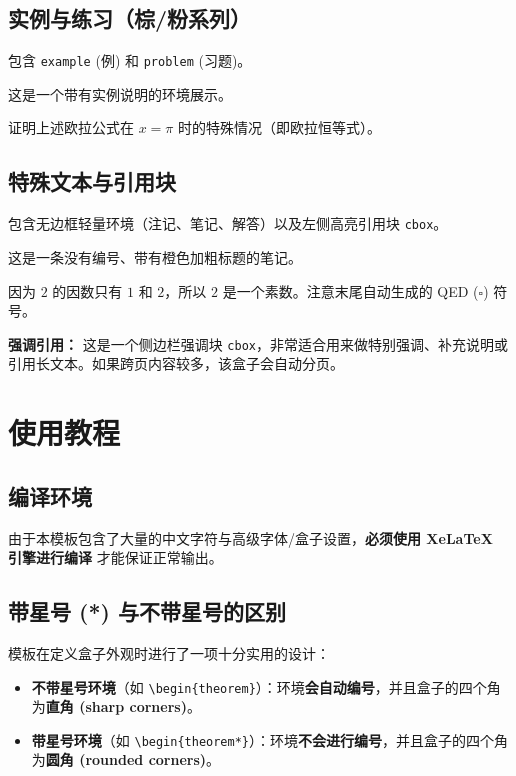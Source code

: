 \documentclass[UTF8]{ctexart}
\begin{document}
\subsection{实例与练习（棕/粉系列）}
包含 \verb|example| (例) 和 \verb|problem| (习题)。

\begin{example}[具体案例]
这是一个带有实例说明的环境展示。
\end{example}

\begin{problem}[课后思考]
证明上述欧拉公式在 $x = \pi$ 时的特殊情况（即欧拉恒等式）。
\end{problem}

\subsection{特殊文本与引用块}
包含无边框轻量环境（注记、笔记、解答）以及左侧高亮引用块 \verb|cbox|。

\begin{note*}[注意事项]
这是一条没有编号、带有橙色加粗标题的笔记。
\end{note*}

\begin{solution}
因为 $2$ 的因数只有 $1$ 和 $2$，所以 $2$ 是一个素数。注意末尾自动生成的 QED ($\square$) 符号。
\end{solution}

\begin{cbox}
\textbf{强调引用：} 这是一个侧边栏强调块 \verb|cbox|，非常适合用来做特别强调、补充说明或引用长文本。如果跨页内容较多，该盒子会自动分页。
\end{cbox}

\section{使用教程}

\subsection{编译环境}
由于本模板包含了大量的中文字符与高级字体/盒子设置，\textbf{必须使用 XeLaTeX 引擎进行编译} 才能保证正常输出。

\subsection{带星号 (*) 与不带星号的区别}
模板在定义盒子外观时进行了一项十分实用的设计：
\begin{itemize}
    \item \textbf{不带星号环境}（如 \verb|\begin{theorem}|）：环境\textbf{会自动编号}，并且盒子的四个角为\textbf{直角 (sharp corners)}。
    \item \textbf{带星号环境}（如 \verb|\begin{theorem*}|）：环境\textbf{不会进行编号}，并且盒子的四个角为\textbf{圆角 (rounded corners)}。
\end{itemize}
\end{document}
